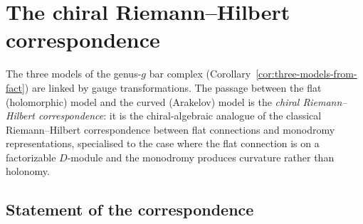 \section{The chiral Riemann--Hilbert correspondence}
\label{sec:chiral-riemann-hilbert}

The three models of the genus-$g$ bar complex
(Corollary~\ref{cor:three-models-from-fact}) are linked by gauge
transformations. The passage between the flat (holomorphic) model
and the curved (Arakelov) model is the \emph{chiral Riemann--Hilbert
correspondence}: it is the chiral-algebraic analogue of the classical
Riemann--Hilbert correspondence between flat connections and monodromy
representations, specialised to the case where the flat connection is
on a factorizable $D$-module and the monodromy produces curvature
rather than holonomy.

\subsection{Statement of the correspondence}
\label{subsec:chiral-RH-statement}

